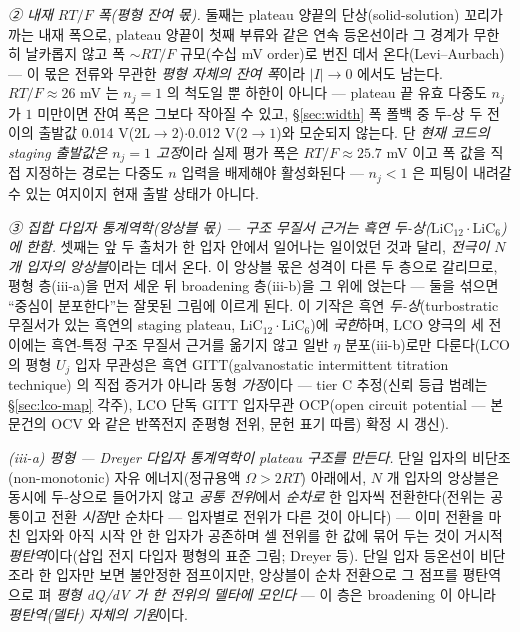 \documentclass[11pt,a4paper]{article}
\begin{document}
\emph{② 내재 $RT/F$ 폭(평형 잔여 몫).} 둘째는 plateau 양끝의 단상(solid-solution) 꼬리가 까는 내재 폭으로, plateau
양끝이 첫째 부류와 같은 연속 등온선이라 그 경계가 무한히 날카롭지 않고 폭 $\sim RT/F$ 규모(수십 mV order)로 번진 데서
온다(Levi--Aurbach\cite{leviaurbach1999}) — 이 몫은 전류와 무관한 \emph{평형 자체의 잔여 폭}이라 $|I|\!\to\!0$ 에서도
남는다. $RT/F\!\approx\!26$ mV 는 $n_j{=}1$ 의 척도일 뿐 하한이 아니다 — plateau 끝 유효 다중도 $n_j$ 가
$1$ 미만이면 잔여 폭은 그보다 작아질 수 있고, \S\ref{sec:width} 폭 폴백 중 두-상 두 전이의 출발값
0.014 V($2\mathrm L\!\to\!2$)$\cdot$0.012 V($2\!\to\!1$)와 모순되지 않는다. 단 \emph{현재 코드의 staging
출발값은 $n_j{=}1$ 고정}이라 실제 평가 폭은 $RT/F\!\approx\!25.7$ mV 이고 폭 값을 직접 지정하는 경로는 다중도
$n$ 입력을 배제해야 활성화된다 — $n_j\!<\!1$ 은 피팅이 내려갈 수 있는 여지이지 현재 출발 상태가 아니다.

\emph{③ 집합 다입자 통계역학(앙상블 몫) — 구조 무질서 근거는 흑연 두-상($\mathrm{LiC_{12}}\cdot\mathrm{LiC_6}$)에 한함.} 셋째는 앞 두 출처가
한 입자 안에서 일어나는 일이었던 것과 달리, \emph{전극이 $N$ 개 입자의 앙상블}이라는 데서 온다. 이 앙상블 몫은 성격이
다른 두 층으로 갈리므로, 평형 층(iii-a)을 먼저 세운 뒤 broadening 층(iii-b)을 그 위에 얹는다 — 둘을 섞으면 ``중심이
분포한다''는 잘못된 그림에 이르게 된다. 이 기작은 흑연 \emph{두-상}(turbostratic 무질서가 있는 흑연의 staging
plateau, $\mathrm{LiC_{12}}\cdot\mathrm{LiC_6}$)에 \emph{국한}하며, LCO 양극의 세 전이에는 흑연-특정 구조 무질서
근거를 옮기지 않고 일반 $\eta$ 분포(iii-b)로만 다룬다(LCO 의 평형 $U_j$ 입자 무관성은 흑연
GITT(galvanostatic intermittent titration technique)\cite{park2021} 의 직접 증거가 아니라 동형
\emph{가정}이다 — tier C 추정(신뢰 등급 범례는 \S\ref{sec:lco-map} 각주), LCO 단독 GITT 입자무관 OCP(open
circuit potential — 본 문건의 OCV 와 같은 반쪽전지 준평형 전위, 문헌 표기 따름) 확정 시 갱신).

\emph{(iii-a) 평형 — Dreyer 다입자 통계역학이 \emph{plateau 구조}를 만든다.} 단일 입자의 비단조(non-monotonic) 자유
에너지(정규용액 $\Omega>2RT$) 아래에서, $N$ 개 입자의 앙상블은 동시에 두-상으로 들어가지 않고 \emph{공통 전위}에서
\emph{순차로} 한 입자씩 전환한다(전위는 공통이고 전환 \emph{시점}만 순차다 — 입자별로 전위가 다른 것이 아니다) —
이미 전환을 마친 입자와 아직 시작 안 한 입자가 공존하며 셀 전위를 한 값에 묶어 두는
것이 거시적 \emph{평탄역}이다(삽입 전지 다입자 평형의 표준 그림; Dreyer 등\cite{dreyer2010}).
단일 입자 등온선이 비단조라 한 입자만 보면 불안정한 점프이지만, 앙상블이 순차 전환으로 그 점프를
평탄역으로 펴 \emph{평형 dQ/dV 가 한 전위의 델타에 모인다} — 이 층은 broadening 이 아니라 \emph{평탄역(델타) 자체의 기원}이다.
\end{document}
